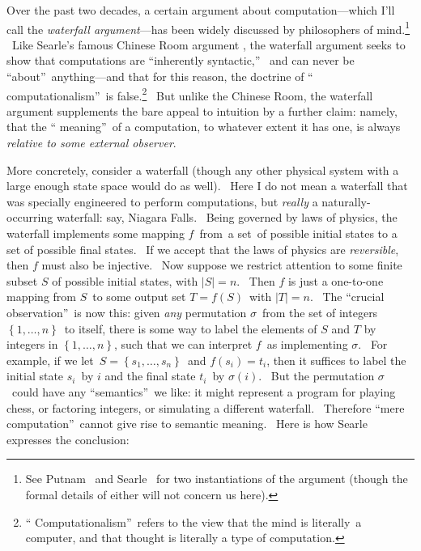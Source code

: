 \documentclass[11pt,onecolumn]{article}%
\begin{document}
Over the past two decades, a certain argument about computation---which I'll
call the \textit{waterfall argument}---has been widely discussed by
philosophers of mind.\footnote{See Putnam \cite[appendix]{putnam}\ and Searle
\cite{searle:redis}\ for two instantiations of the argument (though the formal
details of either will not concern us here).} \ Like Searle's famous Chinese
Room argument \cite{searle}, the waterfall argument seeks to show that
computations are \textquotedblleft inherently syntactic,\textquotedblright%
\ and can never be \textquotedblleft about\textquotedblright\ anything---and
that for this reason, the doctrine of \textquotedblleft
computationalism\textquotedblright\ is false.\footnote{\textquotedblleft
Computationalism\textquotedblright\ refers to the view that the mind is
literally\ a computer, and that thought is literally a type of computation.}
\ But unlike the Chinese Room, the waterfall argument supplements the bare
appeal to intuition by a further claim: namely, that the \textquotedblleft
meaning\textquotedblright\ of a computation, to whatever extent it has one, is
always \textit{relative to some external observer}.

More concretely, consider a waterfall (though any other physical system with a
large enough state space would do as well). \ Here I do not mean a waterfall
that was specially engineered to perform computations, but \textit{really} a
naturally-occurring waterfall: say, Niagara Falls. \ Being governed by laws of
physics, the waterfall implements some mapping $f$\ from\ a set\ of possible
initial states to a set of possible final states. \ If we accept that the laws
of physics are \textit{reversible}, then $f$ must also be injective. \ Now
suppose we restrict attention to some finite subset $S$ of possible initial
states, with $\left\vert S\right\vert =n$. \ Then $f$ is just a one-to-one
mapping from $S$\ to some output set $T=f\left(  S\right)  $\ with $\left\vert
T\right\vert =n$. \ The \textquotedblleft crucial
observation\textquotedblright\ is now this: given \textit{any} permutation
$\sigma$\ from the set of integers $\left\{  1,\ldots,n\right\}  $\ to itself,
there is some way to label the elements of $S$ and $T$ by integers in
$\left\{  1,\ldots,n\right\}  $, such that we can interpret $f$\ as
implementing $\sigma$. \ For example, if we let\ $S=\left\{  s_{1}%
,\ldots,s_{n}\right\}  $\ and $f\left(  s_{i}\right)  =t_{i}$, then it
suffices to label the initial state $s_{i}$\ by $i$ and the final state
$t_{i}$\ by $\sigma\left(  i\right)  $. \ But the permutation $\sigma$\ could
have any \textquotedblleft semantics\textquotedblright\ we like: it might
represent a program for playing chess, or factoring integers, or simulating a
different waterfall. \ Therefore \textquotedblleft mere
computation\textquotedblright\ cannot give rise to semantic meaning. \ Here is
how Searle \cite[p. 57]{searle:redis} expresses the conclusion:
\end{document}
